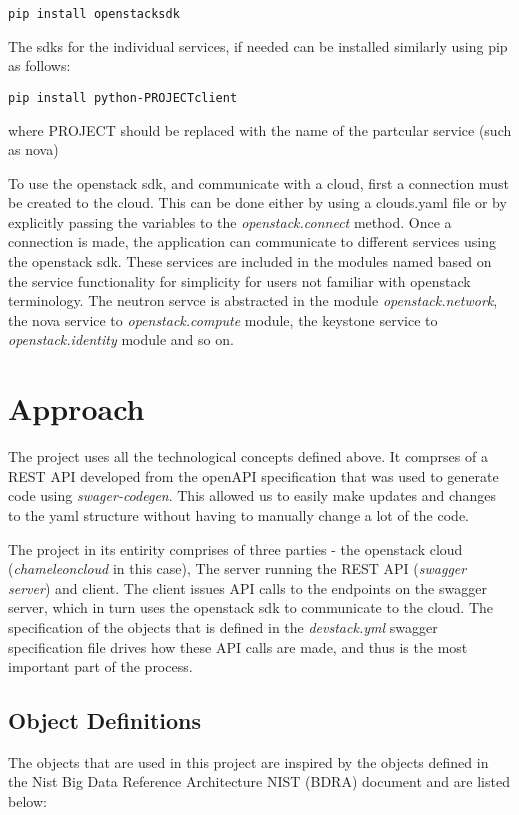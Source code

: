 \begin{verbatim}
pip install openstacksdk
\end{verbatim}

The sdks for the individual services, if needed can be installed
similarly using pip as follows:

\begin{verbatim}
pip install python-PROJECTclient
\end{verbatim}

where PROJECT should be replaced with the name of the partcular
service (such as nova)

To use the openstack sdk, and communicate with a cloud, first a
connection must be created to the cloud. This can be done either by
using a clouds.yaml file or by explicitly passing the variables to
the \emph{openstack.connect\(\)} method. Once a connection is made, the
application can communicate to different services using the openstack
sdk. These services are included in the modules named based on the
service functionality for simplicity for users not familiar with
openstack terminology. The neutron servce is abstracted in the
module \emph{openstack.network}, the nova service
to \emph{openstack.compute} module, the keystone service
to \emph{openstack.identity} module and so on.

\section{Approach}

The project uses all the technological concepts defined above. It
comprses of a REST API developed from the openAPI specification that
was used to generate code using \emph{swager-codegen}. This allowed us
to easily make updates and changes to the yaml structure without
having to manually change a lot of the code.

The project in its entirity comprises of three parties - the openstack
cloud (\emph{chameleoncloud} in this case), The server running the
REST API (\emph{swagger server}) and client. The client issues API
calls to the endpoints on the swagger server, which in turn uses the
openstack sdk to communicate to the cloud. The specification of the
objects that is defined in the \emph{devstack.yml} swagger
specification file drives how these API calls are made, and thus is
the most important part of the process. 

\subsection{Object Definitions}
The objects that are used in this project are inspired by the objects
defined in the Nist Big Data Reference Architecture NIST (BDRA)
document and are listed below:

